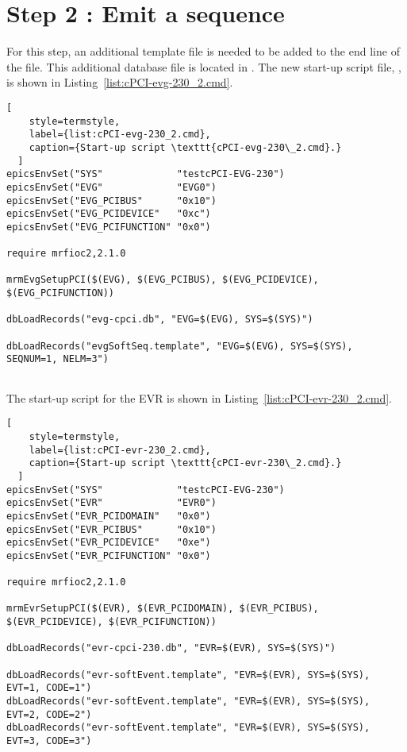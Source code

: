 \documentclass[11pt
  , a4paper
  , article
  , oneside
  , showtrims
]{memoir}
\begin{document}
\section{Step 2 : Emit a sequence}
For this step, an additional template file is needed to be added to the end line of the  file. This additional database file is located in . The new start-up script file, , is shown in Listing~\ref{list:cPCI-evg-230_2.cmd}. 
\begin{lstlisting}[ 
    style=termstyle,
    label={list:cPCI-evg-230_2.cmd},
    caption={Start-up script \texttt{cPCI-evg-230\_2.cmd}.}
  ]
epicsEnvSet("SYS"             "testcPCI-EVG-230")
epicsEnvSet("EVG"             "EVG0")
epicsEnvSet("EVG_PCIBUS"      "0x10")
epicsEnvSet("EVG_PCIDEVICE"   "0xc")
epicsEnvSet("EVG_PCIFUNCTION" "0x0")

require mrfioc2,2.1.0

mrmEvgSetupPCI($(EVG), $(EVG_PCIBUS), $(EVG_PCIDEVICE), $(EVG_PCIFUNCTION))

dbLoadRecords("evg-cpci.db", "EVG=$(EVG), SYS=$(SYS)")

dbLoadRecords("evgSoftSeq.template", "EVG=$(EVG), SYS=$(SYS), SEQNUM=1, NELM=3")
  
\end{lstlisting}


The start-up script for the EVR is shown in Listing~\ref{list:cPCI-evr-230_2.cmd}.
\begin{lstlisting}[ 
    style=termstyle,
    label={list:cPCI-evr-230_2.cmd},
    caption={Start-up script \texttt{cPCI-evr-230\_2.cmd}.}
  ]
epicsEnvSet("SYS"             "testcPCI-EVG-230")
epicsEnvSet("EVR"             "EVR0")
epicsEnvSet("EVR_PCIDOMAIN"   "0x0")
epicsEnvSet("EVR_PCIBUS"      "0x10")
epicsEnvSet("EVR_PCIDEVICE"   "0xe")
epicsEnvSet("EVR_PCIFUNCTION" "0x0")

require mrfioc2,2.1.0

mrmEvrSetupPCI($(EVR), $(EVR_PCIDOMAIN), $(EVR_PCIBUS), $(EVR_PCIDEVICE), $(EVR_PCIFUNCTION))

dbLoadRecords("evr-cpci-230.db", "EVR=$(EVR), SYS=$(SYS)")

dbLoadRecords("evr-softEvent.template", "EVR=$(EVR), SYS=$(SYS), EVT=1, CODE=1")
dbLoadRecords("evr-softEvent.template", "EVR=$(EVR), SYS=$(SYS), EVT=2, CODE=2")
dbLoadRecords("evr-softEvent.template", "EVR=$(EVR), SYS=$(SYS), EVT=3, CODE=3")
  
\end{lstlisting}
\end{document}
